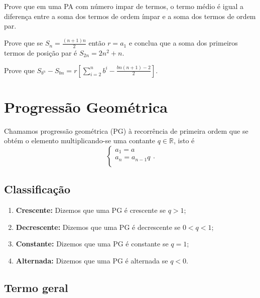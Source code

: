 \noindent [6] Prove que em uma PA com número impar de termos, o termo médio é igual a diferença entre a soma dos termos de ordem ímpar  e a soma dos termos de ordem par.

\noindent [7] Prove que se $S_n = \displaystyle \frac{(n+1)n}{2}$ então $r = a_1$ e conclua que a soma dos primeiros termos de posição par é $S_{2n} = 2n^2 + n$.

\noindent [8] Prove que $S_{b^n} - S_{bn} = \displaystyle r\left[\sum_{i=2}^{n}b^i-\frac{bn(n+1)-2}{2}\right]$.

\section{Progressão Geométrica}
\begin{defin}
Chamamos progressão geométrica (PG) à recorrência de primeira ordem que se obtém o elemento multiplicando-se uma contante $q \in \mathbb{R}$, isto é
\begin{equation}
    \begin{cases}
    a_1 = a\\
    a_{n} = a_{n-1}q\\
    \end{cases}.
\end{equation}
\end{defin}
\subsection{Classificação}
\begin{enumerate}
    \item [(i)] \textbf{Crescente:} Dizemos que uma PG é crescente se $q>1$;
    \item [(ii)] \textbf{Decrescente:} Dizemos que uma PG é decrescente se $0<q<1$;
    \item [(iii)] \textbf{Constante:} Dizemos que uma PG é constante se $q=1$;
    \item [(iv)] \textbf{Alternada:} Dizemos que uma PG é alternada se $q<0$.
\end{enumerate}

\subsection{Termo geral}

